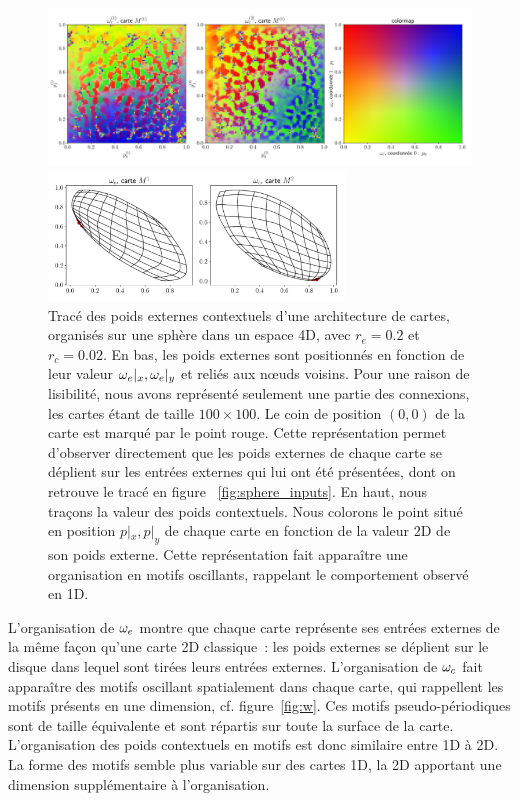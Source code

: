 \documentclass[../main]{subfiles}
\begin{document}
\begin{figure}[h!]
	\begin{minipage}{\textwidth}
	\includegraphics[width=\textwidth]{wc_rc002_afterbug_nopoints.pdf}
	\end{minipage}
	\begin{minipage}{\textwidth}
		\includegraphics[width=0.7\textwidth]{we_rc002_afterbug_step10.pdf}
		\caption{Tracé des poids externes contextuels d'une architecture de cartes, organisés sur une sphère dans un espace 4D, avec $r_e =0.2$ et $r_c = 0.02$.
		En bas, les poids externes sont positionnés en fonction de leur valeur $\omega_e|_x, \omega_e|_y$ et reliés aux n\oe{}uds voisins. Pour une raison de lisibilité, nous avons représenté seulement une partie des connexions, les cartes étant de taille $100 \times 100$. Le coin de position $(0,0)$ de la carte est marqué par le point rouge. Cette représentation permet d'observer directement que les poids externes de chaque carte se déplient sur les entrées externes qui lui ont été présentées, dont on retrouve le tracé en figure ~\ref{fig:sphere_inputs}.
		En haut, nous traçons la valeur des poids contextuels. Nous colorons le point situé en position $p|_x, p|_y$ de chaque carte en fonction de la valeur 2D de son poids externe. Cette représentation fait apparaître une organisation en motifs oscillants, rappelant le comportement observé en 1D.
		\label{fig:2som_s_002_wc}}
		\end{minipage}
\end{figure}


L'organisation de $\omega_e$ montre que chaque carte représente ses entrées externes de la même façon qu'une carte 2D classique~: les poids externes se déplient sur le disque dans lequel sont tirées leurs entrées externes. 
L'organisation de $\omega_c$ fait apparaître des motifs oscillant spatialement dans chaque carte, qui rappellent les motifs présents en une dimension, cf. figure~\ref{fig:w}.
Ces motifs pseudo-périodiques sont de taille équivalente et sont répartis sur toute la surface de la carte. 
L'organisation des poids contextuels en motifs est donc similaire entre 1D à 2D. La forme des motifs semble plus variable sur des cartes 1D, la 2D apportant une dimension supplémentaire à l'organisation.
\end{document}
